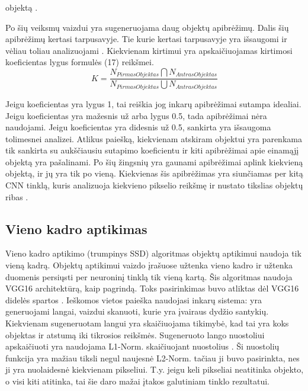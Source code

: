 \documentclass{VUMIFInfKursinis}
\begin{document}
objektą \cite{salt15}.
\par
Po šių veiksmų vaizdui yra sugeneruojama daug objektų apibrėžimų. Dalis šių apibrėžimų
kertasi tarpusavyje. Tie kurie kertasi tarpusavyje yra išsaugomi ir vėliau
toliau analizuojami \cite{salt15}. Kiekvienam kirtimui yra apskaičiuojamas kirtimosi koeficientas lygus formulės (17) reikšmei.
\begin{equation}
  K = \frac{N_{PirmasObjektas} \bigcap N_{AntrasObjektas}}{N_{PirmasObjektas} \bigcup N_{AntrasObjektas}}
\end{equation}
\par
Jeigu koeficientas yra lygus 1, tai reiškia jog inkarų apibrėžimai sutampa idealiai.
Jeigu koeficientas yra mažesnis už arba lygus 0.5, tada apibrėžimai nėra naudojami.
Jeigu koeficientas yra didesnis už 0.5, sankirta yra išsaugoma tolimesnei analizei.
Atlikus paiešką, kiekvienam atskiram objektui yra parenkama tik sankirta su aukščiausiu
sutapimo koeficientu ir kiti apibrėžimai apie einamąjį objektą yra pašalinami.
Po šių žingsnių yra gaunami apibrėžimai aplink kiekvieną objektą, ir jų yra tik po
vieną. Kiekvienas šis apibrėžimas yra siunčiamas per kitą CNN tinklą, kuris analizuoja
kiekvieno pikselio reikšmę ir nustato tikslias objektų ribas \cite{salt15}.

\subsection{Vieno kadro aptikimas}
\par
Vieno kadro aptikimo (trumpinys SSD) algoritmas objektų aptikimui naudoja tik vieną kadrą.
Objektų aptikimui vaizdo įrašuose užtenka vieno kadro ir užtenka
duomenis persiųsti per neuroninį tinklą tik vieną kartą. Šis algoritmas
naudoja VGG16 architektūrą, kaip pagrindą. Toks pasirinkimas buvo atliktas dėl VGG16
didelės spartos \cite{salt20}. Ieškomos vietos paieška naudojasi inkarų sistema:
yra generuojami langai, vaizdui skanuoti, kurie yra įvairaus dydžio santykių.
Kiekvienam sugeneruotam langui yra skaičiuojama tikimybė, kad tai yra koks objektas
ir atstumą iki tikrosios reikšmės. Sugeneruoto lango nuostoliui apskaičiuoti
yra naudojama L1-Norm. skaičiuojant nuostolius \cite{salt20}. Ši nuostolių funkcija
yra mažiau tiksli negul naujesnė L2-Norm. tačiau ji buvo pasirinkta, nes ji yra nuolaidesnė
kiekvienam pikseliui. T.y. jeigu keli pikseliai neatitinka objekto, o visi kiti atitinka,
tai šie daro mažai įtakos galutiniam tinklo rezultatui.
\end{document}
